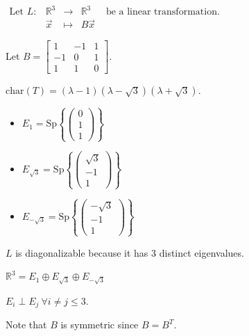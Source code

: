 \documentclass[11pt,fleqn]{book} %
\begin{document}
\begin{example}
{~~~}

    $\begin{matrix} \text{Let }L: &\mathbb{R}^3 &\to &\mathbb{R}^3 &\text{ be a linear transformation. }\\ &\vec{x} &\mapsto &B\vec{x} \end{matrix}$

    Let $B = \begin{bmatrix} 1 &-1 &1 \\ -1 &0 &1 \\ 1 &1 &0 \end{bmatrix}$.

    $\mathrm{char}(T) = (\lambda - 1)(\lambda - \sqrt{3})(\lambda + \sqrt{3})$.

    \begin{itemize}
        \item $E_1 = \mathrm{Sp}\left\{ \begin{pmatrix} 0 \\ 1 \\ 1 \end{pmatrix} \right\}$
        \item $E_{\sqrt{3}} = \mathrm{Sp}\left\{ \begin{pmatrix} \sqrt{3} \\ -1 \\ 1 \end{pmatrix} \right\}$
        \item $E_{-\sqrt{3}} = \mathrm{Sp}\left\{ \begin{pmatrix} -\sqrt{3} \\ -1 \\ 1 \end{pmatrix} \right\}$
    \end{itemize}

    $L$ is diagonalizable because it has $3$ distinct eigenvalues.

    $\mathbb{R}^3 = E_1 \oplus E_{\sqrt{3}} \oplus E_{-\sqrt{3}}$

    $E_i \perp E_j ~ \forall i\neq j \le 3$.

    Note that $B$ is symmetric since $B = B^T$.
\end{example}
\end{document}
